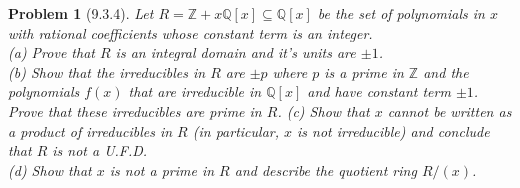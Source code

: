 \documentclass{article}
\newtheorem{problem}{Problem}
\begin{document}
\begin{problem}[9.3.4]
Let $R = \mathbb{Z} + x\mathbb{Q}[x] \subseteq \mathbb{Q}[x]$ be the set of polynomials in $x$ with rational coefficients whose constant term is an integer.\\
(a) Prove that $R$ is an integral domain and it's units are $\pm 1$.\\
(b) Show that the irreducibles in $R$ are $\pm p$ where $p$ is a prime in $\mathbb{Z}$ and the polynomials $f(x)$ that are irreducible in $\mathbb{Q}[x]$ and have constant term $\pm 1$. Prove that these irreducibles are prime in $R$.
(c) Show that $x$ cannot be written as a product of irreducibles in $R$ (in particular, $x$ is not irreducible) and conclude that $R$ is not a U.F.D.\\
(d) Show that $x$ is not a prime in $R$ and describe the quotient ring $R/(x)$.
\end{problem}
\end{document}
